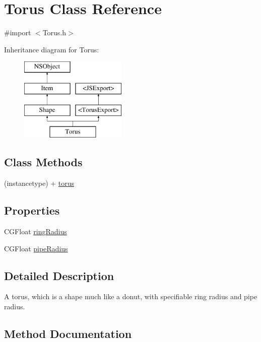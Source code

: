 \hypertarget{interface_torus}{}\section{Torus Class Reference}
\label{interface_torus}


{\ttfamily \#import $<$Torus.\+h$>$}

Inheritance diagram for Torus\+:\begin{figure}[H]
\begin{center}
\leavevmode
\includegraphics[height=4.000000cm]{interface_torus}
\end{center}
\end{figure}
\subsection*{Class Methods}
\begin{DoxyCompactItemize}
\item 
(instancetype) + \hyperlink{interface_torus_a9704cbdab29da815838547c88d9274af}{torus}
\end{DoxyCompactItemize}
\subsection*{Properties}
\begin{DoxyCompactItemize}
\item 
C\+G\+Float \hyperlink{interface_torus_a34419d17ea2059d76ae385e47d49ecb4}{ring\+Radius}
\item 
C\+G\+Float \hyperlink{interface_torus_abf4bb7cfe8bd69c91bfc45a23e65b00e}{pipe\+Radius}
\end{DoxyCompactItemize}


\subsection{Detailed Description}
A torus, which is a shape much like a donut, with specifiable ring radius and pipe radius. 

\subsection{Method Documentation}
\hypertarget{interface_torus_a9704cbdab29da815838547c88d9274af}{}
